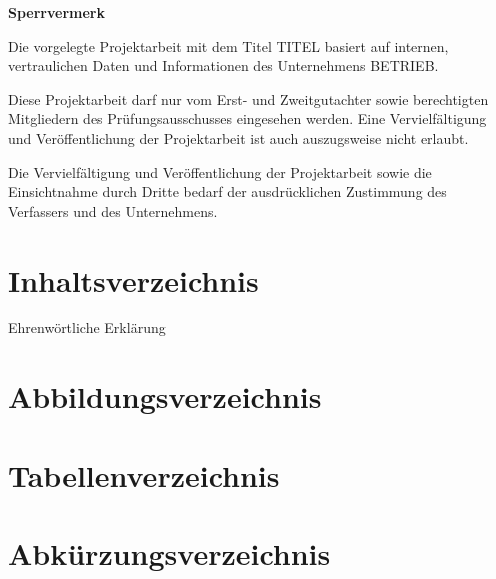 \documentclass[a4paper, 11pt]{article}
\begin{document}
\begin{center}
  \vspace*{5.5cm}
  {\LARGE\bf Sperrvermerk}
  \vspace*{1cm}
\end{center}

Die vorgelegte Projektarbeit mit dem Titel TITEL basiert auf internen, vertraulichen Daten und Informationen des Unternehmens BETRIEB.

Diese Projektarbeit darf nur vom Erst- und Zweitgutachter sowie berechtigten Mitgliedern des Prüfungsausschusses eingesehen werden.
Eine Vervielfältigung und Veröffentlichung der Projektarbeit ist auch auszugsweise nicht erlaubt.

Die Vervielfältigung und Veröffentlichung der Projektarbeit sowie die Einsichtnahme durch Dritte bedarf der ausdrücklichen
Zustimmung des Verfassers und des Unternehmens.
\newpage


\section*{Inhaltsverzeichnis}
\pagestyle{sxoli1}
\renewcommand\contentsname{}
\tableofcontents
Ehrenwörtliche Erklärung
\newpage

\section*{Abbildungsverzeichnis}
\renewcommand\listfigurename{}
\setlength{\cftfigindent}{0em}
\setlength{\cftfignumwidth}{6.5em}
\renewcommand{\cftfigpresnum}{Abbildung }
\listoffigures
\newpage

\section*{Tabellenverzeichnis}
\renewcommand\listtablename{}
\setlength{\cfttabindent}{0em}
\setlength{\cfttabnumwidth}{5.5em}
\renewcommand{\cfttabpresnum}{Tabelle }
\listoftables
\newpage

\section*{Abkürzungsverzeichnis}
\begin{acronym}[**********]
 \end{acronym}
\newpage
\end{document}
